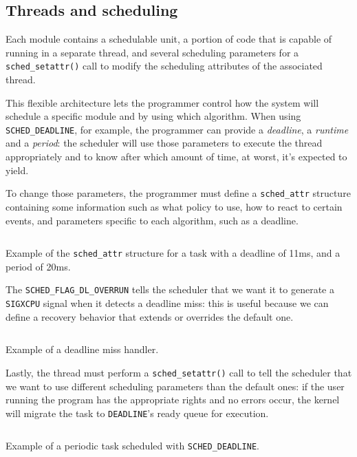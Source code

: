 \documentclass[a4paper,12pt]{report}
\begin{document}
\subsection{Threads and scheduling}
Each module contains a schedulable unit, a portion of code that is capable of running in a separate thread, and several scheduling parameters for a \texttt{sched\_setattr()} call to modify the scheduling attributes of the associated thread.

This flexible architecture lets the programmer control how the system will schedule a specific module and by using which algorithm. When using \texttt{SCHED\_DEADLINE}, for example, the programmer can provide a \textit{deadline}, a \textit{runtime} and a \textit{period}: the scheduler will use those parameters to execute the thread appropriately and to know after which amount of time, at worst, it's expected to yield.

To change those parameters, the programmer must define a \texttt{sched\_attr} structure containing some information such as what policy to use, how to react to certain events, and parameters specific to each algorithm, such as a deadline.

\begin{listing}[H]
\inputminted[frame=single,framesep=10pt]{c}{snippets/sched-attr.c}
\caption{Example of the \texttt{sched\_attr} structure for a task with a deadline of 11ms, and a period of 20ms.}
\end{listing}

The \texttt{SCHED\_FLAG\_DL\_OVERRUN} tells the scheduler that we want it to generate a \texttt{SIGXCPU} signal when it detects a deadline miss: this is useful because we can define a recovery behavior that extends or overrides the default one.

\begin{listing}[H]
\inputminted[frame=single,framesep=10pt]{c}{snippets/dl-miss-handler.c}
\caption{Example of a deadline miss handler.}
\end{listing}

Lastly, the thread must perform a \texttt{sched\_setattr()} call to tell the scheduler that we want to use different scheduling parameters than the default ones: if the user running the program has the appropriate rights and no errors occur, the kernel will migrate the task to \texttt{DEADLINE}'s ready queue for execution.

\begin{listing}[H]
\inputminted[frame=single,framesep=10pt]{c}{snippets/entry-point.c}
\caption{Example of a periodic task scheduled with \texttt{SCHED\_DEADLINE}.}
\end{listing}
\end{document}
